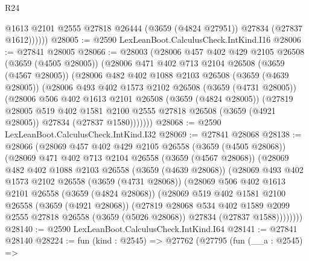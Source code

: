 \begin{lexlean}{R24}
\begin{coremodule}
              @1613
              @2101
              @2555
              @27818
              @26444
              (@3659 (@4824 @27951))
              @27834
              (@27837 @1612))))))
@28005 := @2590 LexLeanBoot.CalculusCheck.IntKind.I16
@28006 := @27841 @28005
@28066 := @28003
    (@28006
      @457
      @402
      @429
      @2105
      @26508
      (@3659 (@4505 @28005))
      (@28006
        @471
        @402
        @713
        @2104
        @26508
        (@3659 (@4567 @28005))
        (@28006
          @482
          @402
          @1088
          @2103
          @26508
          (@3659 (@4639 @28005))
          (@28006
            @493
            @402
            @1573
            @2102
            @26508
            (@3659 (@4731 @28005))
            (@28006
              @506
              @402
              @1613
              @2101
              @26508
              (@3659 (@4824 @28005))
              (@27819
                @28005
                @519
                @402
                @1581
                @2100
                @2555
                @27818
                @26508
                (@3659 (@4921 @28005))
                @27834
                (@27837 @1580)))))))
@28068 := @2590 LexLeanBoot.CalculusCheck.IntKind.I32
@28069 := @27841 @28068
@28138 := @28066
    (@28069
      @457
      @402
      @429
      @2105
      @26558
      (@3659 (@4505 @28068))
      (@28069
        @471
        @402
        @713
        @2104
        @26558
        (@3659 (@4567 @28068))
        (@28069
          @482
          @402
          @1088
          @2103
          @26558
          (@3659 (@4639 @28068))
          (@28069
            @493
            @402
            @1573
            @2102
            @26558
            (@3659 (@4731 @28068))
            (@28069
              @506
              @402
              @1613
              @2101
              @26558
              (@3659 (@4824 @28068))
              (@28069
                @519
                @402
                @1581
                @2100
                @26558
                (@3659 (@4921 @28068))
                (@27819
                  @28068
                  @534
                  @402
                  @1589
                  @2099
                  @2555
                  @27818
                  @26558
                  (@3659 (@5026 @28068))
                  @27834
                  (@27837 @1588))))))))
@28140 := @2590 LexLeanBoot.CalculusCheck.IntKind.I64
@28141 := @27841 @28140
@28224 := fun (kind : @2545) =>
  @27762
    (@27795
      (fun (__a : @2545) =>

\end{coremodule}
\end{lexlean}
